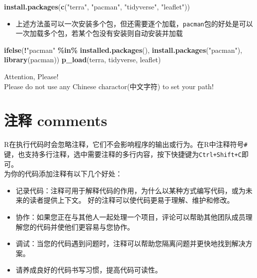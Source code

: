 \documentclass[
]{book}
\newenvironment{Shaded}{\begin{snugshade}}{\end{snugshade}}
\newcommand{\FunctionTok}[1]{\textcolor[rgb]{0.13,0.29,0.53}{\textbf{#1}}}
\newcommand{\NormalTok}[1]{#1}
\newcommand{\SpecialCharTok}[1]{\textcolor[rgb]{0.81,0.36,0.00}{\textbf{#1}}}
\newcommand{\StringTok}[1]{\textcolor[rgb]{0.31,0.60,0.02}{#1}}
\providecommand{\tightlist}{%
  \setlength{\itemsep}{0pt}\setlength{\parskip}{0pt}}
\begin{document}
\begin{Shaded}
\begin{Highlighting}[]
\FunctionTok{install.packages}\NormalTok{(}\FunctionTok{c}\NormalTok{(}\StringTok{"terra"}\NormalTok{, }\StringTok{"pacman"}\NormalTok{, }\StringTok{"tidyverse"}\NormalTok{, }\StringTok{"leaflet"}\NormalTok{))}
\end{Highlighting}
\end{Shaded}

\begin{itemize}
\tightlist
\item
  上述方法虽可以一次安装多个包，但还需要逐个加载，\texttt{pacman}包的好处是可以一次加载多个包，若某个包没有安装则自动安装并加载
\end{itemize}

\begin{Shaded}
\begin{Highlighting}[]
\FunctionTok{ifelse}\NormalTok{(}\SpecialCharTok{!}\StringTok{"pacman"} \SpecialCharTok{\%in\%} \FunctionTok{installed.packages}\NormalTok{(), }\FunctionTok{install.packages}\NormalTok{(}\StringTok{"pacman"}\NormalTok{),}
       \FunctionTok{library}\NormalTok{(pacman))}
\FunctionTok{p\_load}\NormalTok{(terra, tidyverse, leaflet)}
\end{Highlighting}
\end{Shaded}

{Attention, Please!}\\
Please do not use any {Chinese charactor(中文字符)} to set your path!

\hypertarget{ux6ce8ux91ca-comments}{%
\section{注释 comments}\label{ux6ce8ux91ca-comments}}

R在执行代码时会忽略注释，它们不会影响程序的输出或行为。在R中注释符号\texttt{\#}键，也支持多行注释，选中需要注释的多行内容，按下快捷键为\texttt{Ctrl+Shift+C}即可。\\
为你的代码添加注释有以下几个好处：

\begin{itemize}
\tightlist
\item
  记录代码：注释可用于解释代码的作用，为什么以某种方式编写代码，或为未来的读者提供上下文。 好的注释可以使代码更易于理解、维护和修改。\\
\item
  协作：如果您正在与其他人一起处理一个项目，评论可以帮助其他团队成员理解您的代码并使他们更容易与您协作。\\
\item
  调试：当您的代码遇到问题时，注释可以帮助您隔离问题并更快地找到解决方案。\\
\item
  请养成良好的代码书写习惯，提高代码可读性。
\end{itemize}
\end{document}
